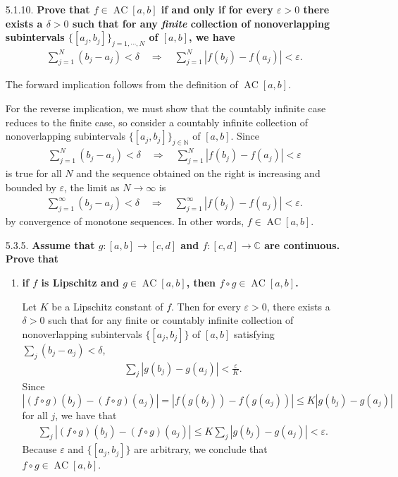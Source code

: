 \documentclass[a4paper,12pt]{article}
\DeclareMathOperator*{\AC}{AC}
\begin{document}
\begin{enumerate}
    \item[5.1.10.]
        \boldmath\textbf{Prove that $f \in \AC[a, b]$ if and only if for every $\varepsilon > 0$ there exists a $\delta > 0$ such that for any \emph{finite} collection of nonoverlapping subintervals $\{[ a_j, b_j ]\}_{j = 1, \cdots, N}$ of $[a, b]$, we have
        \begin{align*}
            \sum_{j = 1}^N (b_j - a_j) < \delta \quad\Longrightarrow\quad \sum_{j = 1}^N |f(b_j) - f(a_j)| < \varepsilon.
        \end{align*}
        }\unboldmath \par
        The forward implication follows from the definition of $\AC[a, b]$. \par
        For the reverse implication, we must show that the countably infinite case reduces to the finite case, so consider a countably infinite collection of nonoverlapping subintervals $\{[ a_j, b_j ]\}_{j \in \mathbb{N}}$ of $[a, b]$. Since
        \begin{align*}
            \sum_{j = 1}^N (b_j - a_j) < \delta \quad\Longrightarrow\quad \sum_{j = 1}^N |f(b_j) - f(a_j)| < \varepsilon
        \end{align*}
        is true for all $N$ and the sequence obtained on the right is increasing and bounded by $\varepsilon$, the limit as $N \to \infty$ is
        \begin{align*}
            \sum_{j = 1}^\infty (b_j - a_j) < \delta \quad\Longrightarrow\quad \sum_{j = 1}^\infty |f(b_j) - f(a_j)| < \varepsilon.
        \end{align*}
        by convergence of monotone sequences. In other words, $f \in \AC[a, b]$.

    \item[5.3.5.]
        \boldmath\textbf{Assume that $g : [a, b] \to [c, d]$ and $f : [c, d] \to \mathbb{C}$ are continuous. Prove that
        }\unboldmath
        \begin{enumerate}
            \item
                \boldmath\textbf{if $f$ is Lipschitz and $g \in \AC[a, b]$, then $f \circ g \in \AC[a, b]$.
                }\unboldmath \par
                Let $K$ be a Lipschitz constant of $f$. Then for every $\varepsilon > 0$, there exists a $\delta > 0$ such that for any finite or countably infinite collection of nonoverlapping subintervals $\{[a_j, b_j]\}$ of $[a, b]$ satisfying $\sum_j (b_j - a_j) < \delta$,
                \begin{align*}
                    \sum_j |g(b_j) - g(a_j)| < \frac{\varepsilon}{K}.
                \end{align*}
                Since $|(f \circ g)(b_j) - (f \circ g)(a_j)| = |f(g(b_j)) - f(g(a_j))| \leq K|g(b_j) - g(a_j)|$ for all $j$, we have that
                \begin{align*}
                    \sum_j |(f \circ g)(b_j) - (f \circ g)(a_j)| \leq K\sum_j |g(b_j) - g(a_j)| < \varepsilon.
                \end{align*}
                Because $\varepsilon$ and $\{[a_j, b_j]\}$ are arbitrary, we conclude that $f \circ g \in \AC[a, b]$.
        \end{enumerate}


\end{enumerate}
\end{document}

